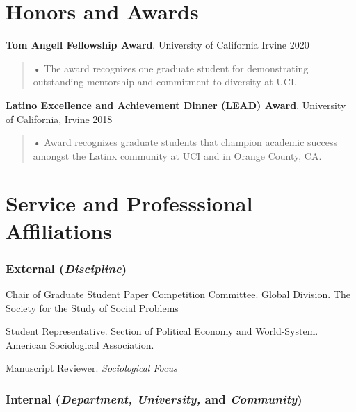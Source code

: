 \documentclass[10pt,]{article}
\renewenvironment{itemize}{
  \begin{list}{}{
    \setlength{\leftmargin}{1.5em}
  }
}{
  \end{list}
}
\begin{document}
\hypertarget{honors-and-awards}{%
\section{Honors and Awards}\label{honors-and-awards}}

\textbf{Tom Angell Fellowship Award}. University of California Irvine
\hfill 2020

\begin{quote}
• The award recognizes one graduate student for demonstrating
outstanding mentorship and commitment to diversity at UCI.
\end{quote}

\textbf{Latino Excellence and Achievement Dinner (LEAD) Award}.
University of California, Irvine \hfill 2018

\begin{quote}
• Award recognizes graduate students that champion academic success
amongst the Latinx community at UCI and in Orange County, CA.
\end{quote}

\hypertarget{service-and-professsional-affiliations}{%
\section{Service and Professsional
Affiliations}\label{service-and-professsional-affiliations}}

\hypertarget{external-discipline}{%
\subsubsection{\texorpdfstring{External
(\emph{Discipline})}{External (Discipline)}}\label{external-discipline}}

\begin{itemize}
\item
  Chair of Graduate Student Paper Competition Committee. Global
  Division. The Society for the Study of Social Problems
\item
  Student Representative. Section of Political Economy and World-System.
  American Sociological Association.
\item
  Manuscript Reviewer. \emph{Sociological Focus}
\end{itemize}

\hypertarget{internal-department-university-and-community}{%
\subsubsection{\texorpdfstring{Internal (\emph{Department, University,}
and
\emph{Community})}{Internal (Department, University, and Community)}}\label{internal-department-university-and-community}}
\end{document}
